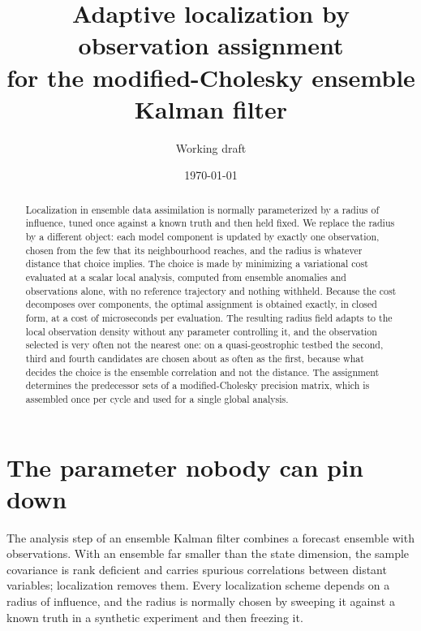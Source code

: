 \documentclass[11pt,a4paper]{article}
\title{\textbf{Adaptive localization by observation assignment\\
for the modified-Cholesky ensemble Kalman filter}}
\author{Working draft}
\date{\today}
\begin{document}
\maketitle
\begin{center}\end{center}

\begin{abstract}
\noindent
Localization in ensemble data assimilation is normally parameterized by a
radius of influence, tuned once against a known truth and then held fixed. We
replace the radius by a different object: each model component is updated by
exactly one observation, chosen from the few that its neighbourhood reaches,
and the radius is whatever distance that choice implies. The choice is made by
minimizing a variational cost evaluated at a scalar local analysis, computed
from ensemble anomalies and observations alone, with no reference trajectory
and nothing withheld. Because the cost decomposes over components, the optimal
assignment is obtained exactly, in closed form, at a cost of microseconds per
evaluation. The resulting radius field adapts to the local observation density
without any parameter controlling it, and the observation selected is very
often not the nearest one: on a quasi-geostrophic testbed the second, third and
fourth candidates are chosen about as often as the first, because what decides
the choice is the ensemble correlation and not the distance. The assignment
determines the predecessor sets of a modified-Cholesky precision matrix, which
is assembled once per cycle and used for a single global analysis.
\end{abstract}

\section{The parameter nobody can pin down}

The analysis step of an ensemble Kalman filter combines a forecast ensemble
with observations. With an ensemble far smaller than the state dimension, the
sample covariance is rank deficient and carries spurious correlations between
distant variables; localization removes them. Every localization scheme depends
on a radius of influence, and the radius is normally chosen by sweeping it
against a known truth in a synthetic experiment and then freezing it.
\end{document}
